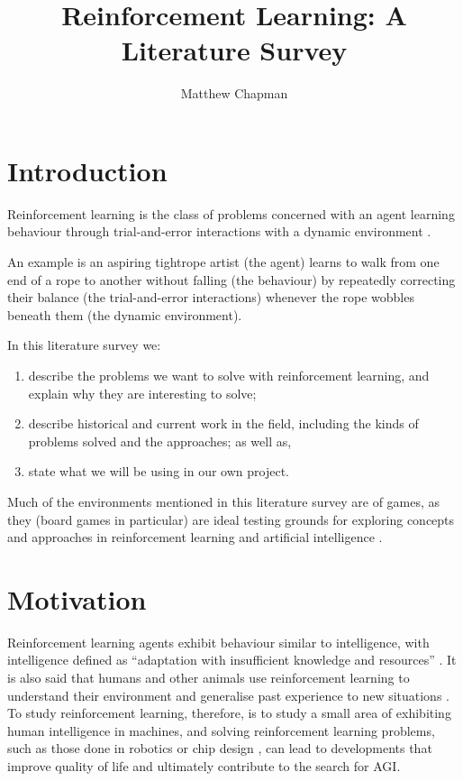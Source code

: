 \documentclass{article}
\title{Reinforcement Learning: A Literature Survey}
\author{Matthew Chapman}
\begin{document}
\maketitle

\section{Introduction}
Reinforcement learning is the class of problems concerned with an agent learning behaviour through trial-and-error interactions with a dynamic environment \cite{Kaelbling1996}.

An example is an aspiring tightrope artist (the agent) learns to walk
from one end of a rope to another without falling (the behaviour) by
repeatedly correcting their balance (the trial-and-error interactions) whenever the rope wobbles beneath them (the dynamic environment).

In this literature survey we: 
\begin{enumerate}
  \item{describe the problems we want to solve with reinforcement learning, and explain why they are interesting to solve;} 
  \item{describe historical and current work in the field, including the kinds of problems solved and the approaches; as well as,} 
  \item{state what we will be using in our own project.}
\end{enumerate}

Much of the environments mentioned in this literature survey are of games, as they (board games in particular) are ideal testing grounds for exploring concepts and approaches in reinforcement learning and artificial intelligence \cite{Tesauro1995}.

\section{Motivation}
Reinforcement learning agents exhibit behaviour similar to intelligence, with intelligence defined as ``adaptation with insufficient knowledge and resources'' \cite{OnDefiningArtificialIntelligence}. It is also said that humans and other animals use reinforcement learning to understand their environment and generalise past experience to new situations \cite{Mnih2015}. To study reinforcement learning, therefore, is to study a small area of exhibiting human intelligence in machines, and solving reinforcement learning problems, such as those done in robotics \cite{Kober2013} or chip design  \cite{Ipek2008}, can lead to developments that improve quality of life and ultimately contribute to the search for AGI.
\end{document}
